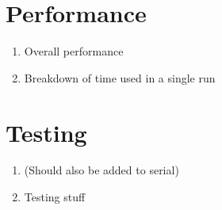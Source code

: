 \section{Performance}
\begin{enumerate}
  \item Overall performance 
  \item Breakdown of time used in a single run
\end{enumerate}

\section{Testing}
\begin{enumerate}
  \item{(Should also be added to serial)}
  \item Testing stuff
\end{enumerate}